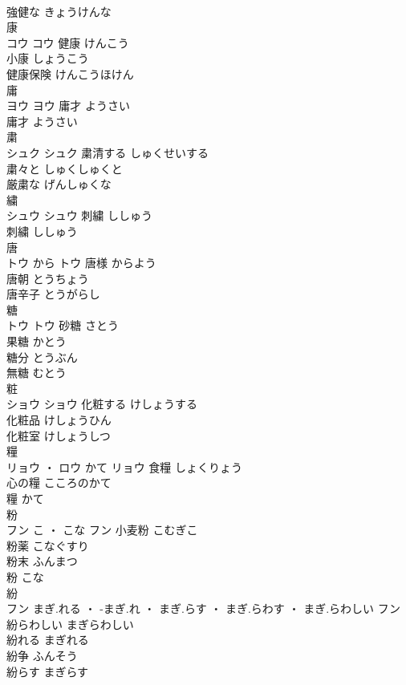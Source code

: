 \documentclass[8pt]{extreport}
\begin{document}
\begin{CJK}{UTF8}{min}
\\	強健な	きょうけんな	
\\	康	
\\	コウ		コウ	健康	けんこう	
\\	小康	しょうこう	
\\	健康保険	けんこうほけん	
\\	庸	
\\	ヨウ		ヨウ	庸才	ようさい	
\\	庸才	ようさい	
\\	粛	
\\	シュク		シュク	粛清する	しゅくせいする	
\\	粛々と	しゅくしゅくと	
\\	厳粛な	げんしゅくな	
\\	繍	
\\	シュウ		シュウ	刺繍	ししゅう	
\\	刺繍	ししゅう	
\\	唐	
\\	トウ	から	トウ	唐様	からよう	
\\	唐朝	とうちょう	
\\	唐辛子	とうがらし	
\\	糖	
\\	トウ		トウ	砂糖	さとう	
\\	果糖	かとう	
\\	糖分	とうぶん	
\\	無糖	むとう	
\\	粧	
\\	ショウ		ショウ	化粧する	けしょうする	
\\	化粧品	けしょうひん	
\\	化粧室	けしょうしつ	
\\	糧	
\\	リョウ ・ ロウ	かて	リョウ	食糧	しょくりょう	
\\	心の糧	こころのかて	
\\	糧	かて	
\\	粉	
\\	フン	こ ・ こな	フン	小麦粉	こむぎこ	
\\	粉薬	こなぐすり	
\\	粉末	ふんまつ	
\\	粉	こな	
\\	紛	
\\	フン	まぎ.れる ・ -まぎ.れ ・ まぎ.らす ・ まぎ.らわす ・ まぎ.らわしい	フン	紛らわしい	まぎらわしい	
\\	紛れる	まぎれる	
\\	紛争	ふんそう	
\\	紛らす	まぎらす	

\end{CJK}
\end{document}
